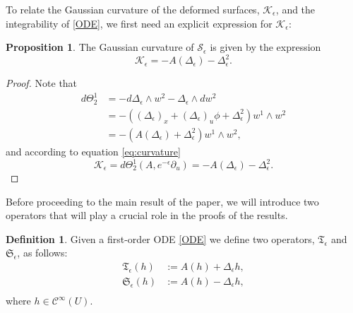 \documentclass{article}
\theoremstyle{remark}
\theoremstyle{definition}
\newtheorem{proposition}[remark]{Proposition}
\newtheorem{definition}[remark]{Definition}
\begin{document}
To relate the Gaussian curvature of the deformed surfaces, $\mathcal{K}_{\epsilon}$, and the integrability of \eqref{ODE}, we first need an explicit expression for $\mathcal{K}_{\epsilon}$:
\begin{proposition}\label{prop:curvature}
The Gaussian curvature of $\mathcal{S}_{\epsilon}$ is given by the expression
\begin{equation}
    \mathcal{K}_{\epsilon}=-A(\Delta_{\epsilon})-\Delta_{\epsilon}^2.
\end{equation}   

\end{proposition}

\begin{proof}
Note that
$$
\begin{aligned}
    d\Theta_2^1 &= -d\Delta_{\epsilon} \wedge w^2 - \Delta_{\epsilon} \wedge dw^2 \\
    &= -\left( (\Delta_{\epsilon})_x + (\Delta_{\epsilon})_u \phi + \Delta_{\epsilon}^2 \right) w^1 \wedge w^2 \\
    &= -\left( A(\Delta_{\epsilon}) + \Delta_{\epsilon}^2 \right) w^1 \wedge w^2,
\end{aligned}
$$
and according to equation \eqref{eq:curvature}
$$
\mathcal{K}_{\epsilon}=d\Theta_2^1(A,e^{-\epsilon}\partial_u)=-A(\Delta_{\epsilon})-\Delta_{\epsilon}^2.
$$
\end{proof}


Before proceeding to the main result of the paper, we will introduce two operators that will play a crucial role in the proofs of the results. 
\begin{definition}\label{def:oper}
Given a first-order ODE \eqref{ODE} we define two operators, $\mathfrak{T}_{\epsilon}$ and $\mathfrak{S}_{\epsilon}$, as follows:
\begin{equation}
    \begin{aligned}
        \mathfrak{T}_{\epsilon}(h)&:=A(h)+\Delta_{\epsilon}h,\\
        \mathfrak{S}_{\epsilon}(h)&:=A(h)-\Delta_{\epsilon}h,\\
    \end{aligned}
\end{equation}
where $h\in \mathcal{C}^{\infty}(U)$.
\end{definition}
\end{document}
